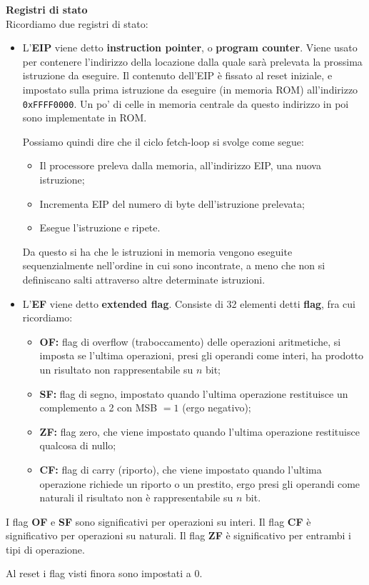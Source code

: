 \documentclass[a4paper,11pt]{article}
\begin{document}
\par\medskip
\noindent
\textbf{\textsf{Registri di stato}} \\
Ricordiamo due registri di stato:
\begin{itemize}
	\item  L'\textbf{EIP} viene detto \textbf{instruction pointer}, o \textbf{program counter}.
Viene usato per contenere l'indirizzo della locazione dalla quale sarà prelevata la prossima istruzione da eseguire.
Il contenuto dell'EIP è fissato al reset iniziale, e impostato sulla prima istruzione da eseguire (in memoria ROM) all'indirizzo \texttt{0xFFFF0000}.
Un po' di celle in memoria centrale da questo indirizzo in poi sono implementate in ROM.

Possiamo quindi dire che il ciclo fetch-loop si svolge come segue:
\begin{itemize}
	\item Il processore preleva dalla memoria, all'indirizzo EIP, una nuova istruzione;
	\item Incrementa EIP del numero di byte dell'istruzione prelevata;
	\item Esegue l'istruzione e ripete.
\end{itemize}

Da questo si ha che le istruzioni in memoria vengono eseguite sequenzialmente nell'ordine in cui sono incontrate, a meno che non si definiscano salti attraverso altre determinate istruzioni.
	
\item L'\textbf{EF} viene detto \textbf{extended flag}.
Consiste di 32 elementi detti \textbf{flag}, fra cui ricordiamo:
\begin{itemize}
	\item \textbf{OF:} flag di overflow (traboccamento) delle operazioni aritmetiche, si imposta se l'ultima operazioni, presi gli operandi come interi, ha prodotto un risultato non rappresentabile su $n$ bit;
	\item \textbf{SF:} flag di segno, impostato quando l'ultima operazione restituisce un complemento a 2 con MSB $= 1$ (ergo negativo);
	\item \textbf{ZF:} flag zero, che viene impostato quando l'ultima operazione restituisce qualcosa di nullo;
	\item \textbf{CF:} flag di carry (riporto), che viene impostato quando l'ultima operazione richiede un riporto o un prestito, ergo presi gli operandi come naturali il risultato non è rappresentabile su $n$ bit.
\end{itemize}

\end{itemize}

I flag \textbf{OF} e \textbf{SF} sono significativi per operazioni su interi.
Il flag \textbf{CF} è significativo per operazioni su naturali.
Il flag \textbf{ZF} è significativo per entrambi i tipi di operazione.

Al reset i flag visti finora sono impostati a 0.
\end{document}
